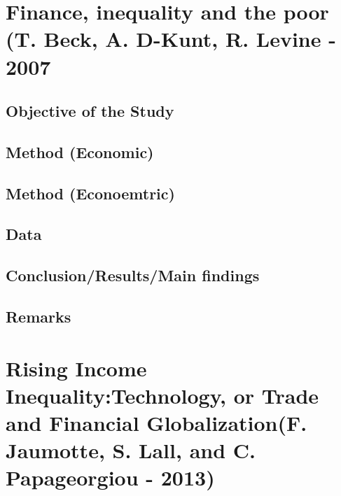\documentclass[a4paper,12pt]{scrartcl} %
\begin{document}
\clearpage                %




\tableofcontents
\clearpage
\listoffigures
\clearpage
\listoftables
\clearpage
\printglossary[type=\acronymtype,style=long,title=List of Abbreviations]
\clearpage
\printglossary[type=symbolslist,style=long,title=List of Symbols]
\clearpage


\setcounter{page}{1}        %

\section{Finance, inequality and the poor (T. Beck, A. D-Kunt, R. Levine - 2007}
\subsection{Objective of the Study}
\subsection{Method (Economic)}
\subsection{Method (Econoemtric)}
\subsection{Data}
\subsection{Conclusion/Results/Main findings}
\subsection{Remarks}
%
%
%
%
%
\clearpage
\section{Rising Income Inequality:Technology, or Trade and Financial Globalization(F. Jaumotte, S. Lall, and C. Papageorgiou - 2013)}
\end{document}
